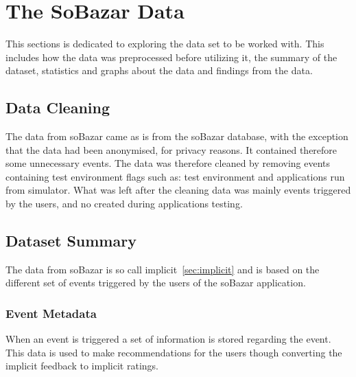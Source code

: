 
\section{The SoBazar Data}
    This sections is dedicated to exploring the data set to be worked with.
    This includes how the data was preprocessed before utilizing it, the summary of the dataset, statistics and graphs about the data and findings from the data.

\subsection{Data Cleaning}
    The data from soBazar came as is from the soBazar database, with the exception that the data had been anonymised, for privacy reasons.
    It contained therefore some unnecessary events.
    The data was therefore cleaned by removing events containing test environment flags such as: test environment and applications run from simulator.
    What was left after the cleaning data was mainly events triggered by the users, and no created during applications testing.

\subsection{Dataset Summary}
    The data from soBazar is so call implicit~\ref{sec:implicit} and is based on the different set of events triggered by the users of the soBazar application.

\subsubsection{Event Metadata}
    When an event is triggered a set of information is stored regarding the event.
    This data is used to make recommendations for the users though converting the implicit feedback to implicit ratings.

